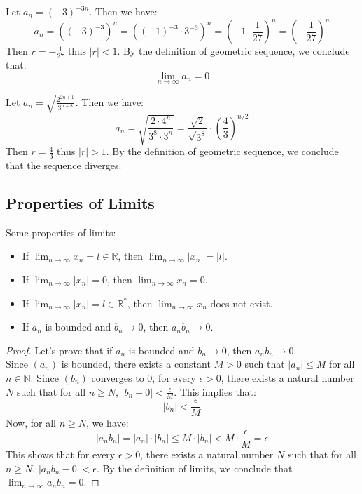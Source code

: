 \begin{eg}
    Let $a_n = (-3)^{-3n}$. Then we have:
    \[ a_n = ((-3)^{-3})^n = ((-1)^{-3} \cdot 3^{-3})^n = (-1 \cdot \frac{1}{27})^n = (-\frac{1}{27})^n \]
    Then $r = -\frac{1}{27}$ thus $|r| < 1$. By the definition of geometric sequence, we conclude that:
    \[ \lim_{n \to \infty} a_n = 0 \]
\end{eg}

\begin{eg}
    Let $a_n = \sqrt{\frac{2^{2n + 1}}{3^{n + 8}}}$. Then we have:
    \[ a_n = \sqrt{\frac{2 \cdot 4^n}{3^8 \cdot 3^n}} = \frac{\sqrt{2}}{\sqrt{3^8}} \cdot \left(\frac{4}{3}\right)^{n/2} \]
    Then $r = \frac{4}{3}$ thus $|r| > 1$. By the definition of geometric sequence, we conclude that the sequence diverges.
\end{eg}

\subsection{Properties of Limits}
Some properties of limits:
\begin{itemize}[itemsep=1pt,label=$\circ$]
    \item If $\lim_{n \to \infty} x_n = l \in \mathbb{R}$, then $\lim_{n \to \infty} |x_n| = |l|$.
    \item If $\lim_{n \to \infty} |x_n| = 0$, then $\lim_{n \to \infty} x_n = 0$.
    \item If $\lim_{n \to \infty} |x_n| = l \in \mathbb{R}^*$, then $\lim_{n \to \infty} x_n$ does not exist.
    \item If $a_n$ is bounded and $b_n \to 0$, then $a_n b_n \to 0$.
\end{itemize}
\begin{proof}
    Let's prove that if $a_n$ is bounded and $b_n \to 0$, then $a_n b_n \to 0$. \\
    Since \( (a_n) \) is bounded, there exists a constant \( M > 0 \) such that \( |a_n| \leq M \) for all \( n \in \mathbb{N} \). Since \( (b_n) \) converges to 0, for every \( \epsilon > 0 \), there exists a natural number \( N \) such that for all \( n \geq N \), \( |b_n - 0| < \frac{\epsilon}{M} \). This implies that:
    \[ |b_n| < \frac{\epsilon}{M} \]
    Now, for all \( n \geq N \), we have:
    \[ |a_n b_n| = |a_n| \cdot |b_n| \leq M \cdot |b_n| < M \cdot \frac{\epsilon}{M} = \epsilon \]
    This shows that for every \( \epsilon > 0 \), there exists a natural number \( N \) such that for all \( n \geq N \), \( |a_n b_n - 0| < \epsilon \). By the definition of limits, we conclude that \( \lim_{n \to \infty} a_n b_n = 0 \).
\end{proof}


